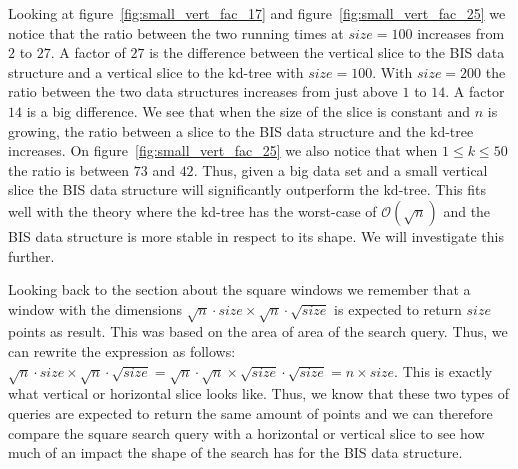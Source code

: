Looking at figure~\ref{fig:small_vert_fac_17} and figure~\ref{fig:small_vert_fac_25} we notice that the ratio between the two running times at $size = 100$ increases from $2$ to $27$. A factor of $27$ is the difference between the vertical slice to the BIS data structure and a vertical slice to the kd-tree with $size = 100$. With $size = 200$ the ratio between the two data structures increases from just above $1$ to $14$. A factor $14$ is a big difference. We see that when the size of the slice is constant and $n$ is growing, the ratio between a slice to the BIS data structure and the kd-tree increases. On figure~\ref{fig:small_vert_fac_25} we also notice that when $1 \leq k \leq 50$ the ratio is between $73$ and $42$. Thus, given a big data set and a small vertical slice the BIS data structure will significantly outperform the kd-tree. This fits well with the theory where the kd-tree has the worst-case of $\mathcal{O}(\sqrt{n})$ and the BIS data structure is more stable in respect to its shape. We will investigate this further.

Looking back to the section about the square windows we remember that a window with the dimensions $\sqrt{n}\cdot{size} \times \sqrt{n}\cdot\sqrt{size}$ is expected to return $size$ points as result. This was based on the area of area of the search query. Thus, we can rewrite the expression as follows: $\sqrt{n}\cdot{size} \times \sqrt{n}\cdot\sqrt{size} = \sqrt{n}\cdot\sqrt{n} \times \sqrt{size}\cdot\sqrt{size} = n \times size$. This is exactly what vertical or horizontal slice looks like. Thus, we know that these two types of queries are expected to return the same amount of points and we can therefore compare the square search query with a horizontal or vertical slice to see how much of an impact the shape of the search has for the BIS data structure.

